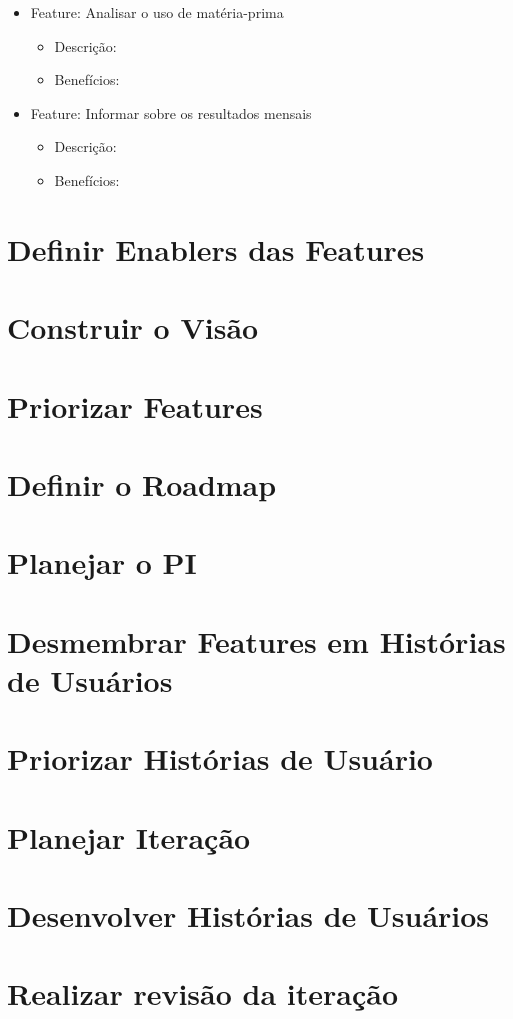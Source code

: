 \begin{itemize}

\item Feature: Analisar o uso de matéria-prima
\begin{itemize}
	\item Descrição:
	\item Benefícios:
\end{itemize}

\item Feature: Informar sobre os resultados mensais
\begin{itemize}
	\item Descrição:
	\item Benefícios:
\end{itemize}

\end{itemize}

\section{Definir Enablers das Features}

\section{Construir o Visão}

\section{Priorizar Features}

\section{Definir o Roadmap}

\section{Planejar o PI}

\section{Desmembrar Features em Histórias de Usuários}

\section{Priorizar Histórias de Usuário}

\section{Planejar Iteração}

\section{Desenvolver Histórias de Usuários}

\section{Realizar revisão da iteração}
